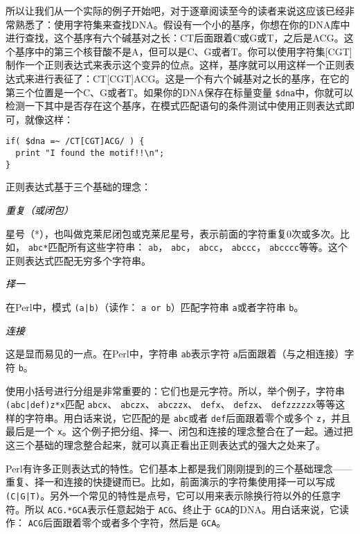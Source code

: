 所以让我们从一个实际的例子开始吧，对于逐章阅读至今的读者来说这应该已经非常熟悉了：使用字符集来查找DNA。假设有一个小的基序，你想在你的DNA库中进行查找，这个基序有六个碱基对之长：CT后面跟着C或G或T，之后是ACG。这个基序中的第三个核苷酸不是A，但可以是C、G或者T。你可以使用字符集[CGT]制作一个正则表达式来表示这个变异的位点。这样，基序就可以用这样一个正则表达式来进行表征了：CT[CGT]ACG。这是一个有六个碱基对之长的基序，在它的第三个位置是一个C、G或者T。如果你的DNA保存在标量变量 \verb|$dna|中，你就可以检测一下其中是否存在这个基序，在模式匹配语句的条件测试中使用正则表达式即可，就像这样：

\begin{lstlisting}
if( $dna =~ /CT[CGT]ACG/ ) {
  print "I found the motif!!\n";
}
\end{lstlisting}

正则表达式基于三个基础的理念：

\textcolor{black}{\textit{重复（或闭包）}}
\begin{adjustwidth}{4em}{}
\hspace*{2em}星号（*），也叫做克莱尼闭包或克莱尼星号，表示前面的字符重复0次或多次。比如， \verb|abc*|匹配所有这些字符串： \verb|ab|， \verb|abc|， \verb|abcc|， \verb|abccc|， \verb|abcccc|等等。这个正则表达式匹配无穷多个字符串。
\end{adjustwidth}

\textcolor{black}{\textit{择一}}
\begin{adjustwidth}{4em}{}
\hspace*{2em}在Perl中，模式 \verb=(a|b)=（读作： \verb|a or b|）匹配字符串 \verb|a|或者字符串 \verb|b|。
\end{adjustwidth}

\textcolor{black}{\textit{连接}}
\begin{adjustwidth}{4em}{}
\hspace*{2em}这是显而易见的一点。在Perl中，字符串 \verb|ab|表示字符 \verb|a|后面跟着（与之相连接）字符 \verb|b|。
\end{adjustwidth}

使用小括号进行分组是非常重要的：它们也是元字符。所以，举个例子，字符串 \verb=(abc|def)z*x=匹配 \verb|abcx|、 \verb|abczx|、 \verb|abczzx|、 \verb|defx|、 \verb|defzx|、 \verb|defzzzzzx|等等这样的字符串。用白话来说，它匹配的是 \verb|abc|或者 \verb|def|后面跟着零个或多个 \verb|z|，并且最后是一个 \verb|x|。这个例子把分组、择一、闭包和连接的理念整合在了一起。通过把这三个基础的理念整合起来，就可以真正看出正则表达式的强大之处来了。

Perl有许多正则表达式的特性。它们基本上都是我们刚刚提到的三个基础理念——重复、择一和连接的快捷键而已。比如，前面演示的字符集使用择一可以写成 \verb=(C|G|T)=。另外一个常见的特性是点号，它可以用来表示除换行符以外的任意字符。所以 \verb|ACG.*GCA|表示任意起始于 \verb|ACG|、终止于 \verb|GCA|的DNA。用白话来说，它读作： \verb|ACG|后面跟着零个或者多个字符，然后是 \verb|GCA|。

